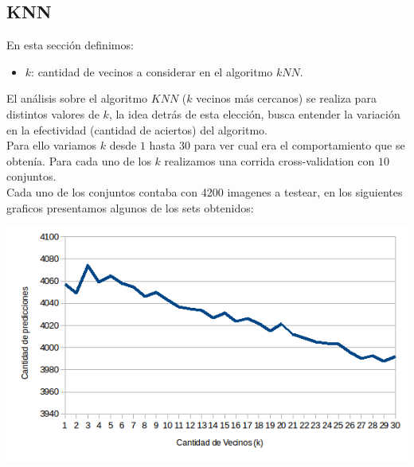 \subsection{KNN}
En esta sección definimos:
\begin{itemize}
	\item $k$: cantidad de vecinos a considerar en el algoritmo $kNN$.
\end{itemize}
El análisis sobre el algoritmo $KNN$ ($k$ vecinos más cercanos) se realiza para distintos valores de $k$, la idea detrás de esta elección, busca entender la variación en la efectividad (cantidad de aciertos) del algoritmo.
\\
Para ello variamos $k$ desde $1$ hasta $30$ para ver cual era el comportamiento que se obtenía. Para cada uno de los $k$ realizamos una corrida cross-validation con $10$ conjuntos.
\\
Cada uno de los conjuntos contaba con 4200 imagenes a testear, en los siguientes graficos presentamos algunos de los sets obtenidos:

\includegraphics[scale=0.55]{nuevosResultados/knn/1.png}\\


